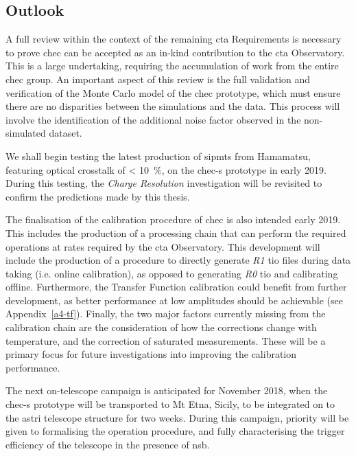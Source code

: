 \subsection{Outlook}
 
A full review within the context of the remaining \gls{cta} Requirements is necessary to prove \gls{chec} can be accepted as an in-kind contribution to the \gls{cta} Observatory. This is a large undertaking, requiring the accumulation of work from the entire \gls{chec} group. An important aspect of this review is the full validation and verification of the Monte Carlo model of the \gls{chec} prototype, which must ensure there are no disparities between the simulations and the data. This process will involve the identification of the additional noise factor observed in the non-simulated dataset.

We shall begin testing the latest production of \glspl{sipmt} from Hamamatsu, featuring optical crosstalk of \SI{< 10}{\percent}, on the \gls{chec-s} prototype in early 2019. During this testing, the \textit{Charge Resolution} investigation will be revisited to confirm the predictions made by this thesis.

The finalisation of the calibration procedure of \gls{chec} is also intended early 2019. This includes the production of a processing chain that can perform the required operations at rates required by the \gls{cta} Observatory. This development will include the production of a procedure to directly generate \textit{R1} \gls{tio} files during data taking (i.e. online calibration), as opposed to generating \textit{R0} \gls{tio} and calibrating offline. Furthermore, the Transfer Function calibration could benefit from further development, as better performance at low amplitudes should be achievable (see Appendix~\ref{a4-tf}). Finally, the two major factors currently missing from the calibration chain are the consideration of how the corrections change with temperature, and the correction of saturated measurements. These will be a primary focus for future investigations into improving the calibration performance.

The next on-telescope campaign is anticipated for November 2018, when the \gls{chec-s} prototype will be transported to Mt Etna, Sicily, to be integrated on to the \gls{astri} telescope structure for two weeks. During this campaign, priority will be given to formalising the operation procedure, and fully characterising the trigger efficiency of the telescope in the presence of \gls{nsb}.